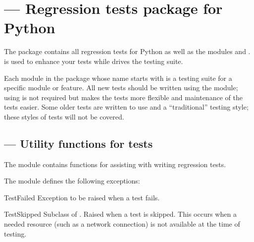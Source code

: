 \section{ ---
         Regression tests package for Python}






The  package contains all regression tests for Python as well as
the modules  and .
 is used to enhance your tests while 
drives the testing suite.

Each module in the  package whose name starts with
 is a testing suite for a specific module or feature.
All new tests should be written using the  module; using
 is not required but makes the tests more flexible and
maintenance of the tests easier.
Some older tests are written to use  and a ``traditional''
testing style; these styles of tests will not be covered.

\begin{seealso}
\end{seealso}


\subsection{ --- Utility functions for tests}

The  module contains functions for assisting
with writing regression tests.

The  module defines the following exceptions:

\begin{excdesc}{TestFailed}
Exception to be raised when a test fails.
\end{excdesc}

\begin{excdesc}{TestSkipped}
Subclass of .
Raised when a test is skipped.
This occurs when a needed resource (such as a network connection) is not
available at the time of testing.
\end{excdesc}

